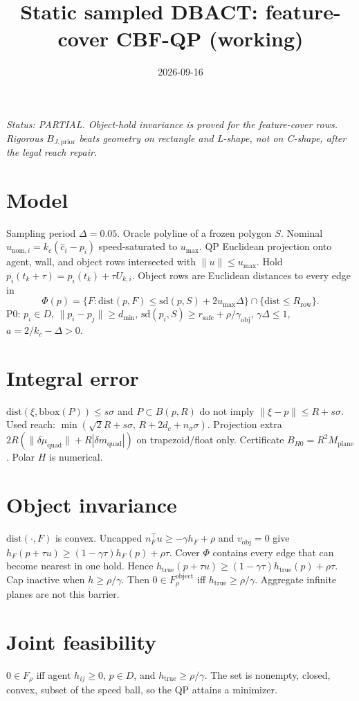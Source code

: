 \documentclass{article}
\title{Static sampled DBACT: feature-cover CBF-QP (working)}
\author{}
\date{2026-09-16}
\begin{document}
\maketitle
\noindent\textit{Status: PARTIAL. Object-hold invariance is proved for the feature-cover rows. Rigorous $B_{J,\mathrm{prior}}$ beats geometry on rectangle and L-shape, not on C-shape, after the legal reach repair.}

\section{Model}
Sampling period $\Delta=0.05$. Oracle polyline of a frozen polygon $S$. Nominal $u_{\mathrm{nom},i}=k_c(\hat c_i-p_i)$ speed-saturated to $u_{\max}$. QP Euclidean projection onto agent, wall, and object rows intersected with $\|u\|\le u_{\max}$. Hold $p_i(t_k+\tau)=p_i(t_k)+\tau U_{k,i}$. Object rows are Euclidean distances to every edge in
\[
\Phi(p)=\{F:\mathrm{dist}(p,F)\le \mathrm{sd}(p,S)+2u_{\max}\Delta\}\cap\{\mathrm{dist}\le R_{\mathrm{row}}\}.
\]
P0: $p_i\in D$, $\|p_i-p_j\|\ge d_{\min}$, $\mathrm{sd}(p_i,S)\ge r_{\mathrm{safe}}+\rho/\gamma_{\mathrm{obj}}$, $\gamma\Delta\le 1$, $a=2/k_c-\Delta>0$.

\section{Integral error}
$\mathrm{dist}(\xi,\mathrm{bbox}(P))\le s\sigma$ and $P\subset B(p,R)$ do not imply $\|\xi-p\|\le R+s\sigma$. Used reach: $\min(\sqrt{2}R+s\sigma,\,R+2d_c+n_\sigma\sigma)$. Projection extra $2R(\|\delta\mu_{\mathrm{quad}}\|+R|\delta m_{\mathrm{quad}}|)$ on trapezoid/float only. Certificate $B_{H0}=R^2 M_{\mathrm{plane}}$. Polar $H$ is numerical.

\section{Object invariance}
$\mathrm{dist}(\cdot,F)$ is convex. Uncapped $n_F^\top u\ge -\gamma h_F+\rho$ and $v_{\mathrm{obj}}=0$ give $h_F(p+\tau u)\ge(1-\gamma\tau)h_F(p)+\rho\tau$. Cover $\Phi$ contains every edge that can become nearest in one hold. Hence $h_{\mathrm{true}}(p+\tau u)\ge(1-\gamma\tau)h_{\mathrm{true}}(p)+\rho\tau$. Cap inactive when $h\ge\rho/\gamma$. Then $0\in F_\rho^{\mathrm{object}}$ iff $h_{\mathrm{true}}\ge\rho/\gamma$. Aggregate infinite planes are not this barrier.

\section{Joint feasibility}
$0\in F_\rho$ iff agent $h_{ij}\ge 0$, $p\in D$, and $h_{\mathrm{true}}\ge\rho/\gamma$. The set is nonempty, closed, convex, subset of the speed ball, so the QP attains a minimizer.
\end{document}
